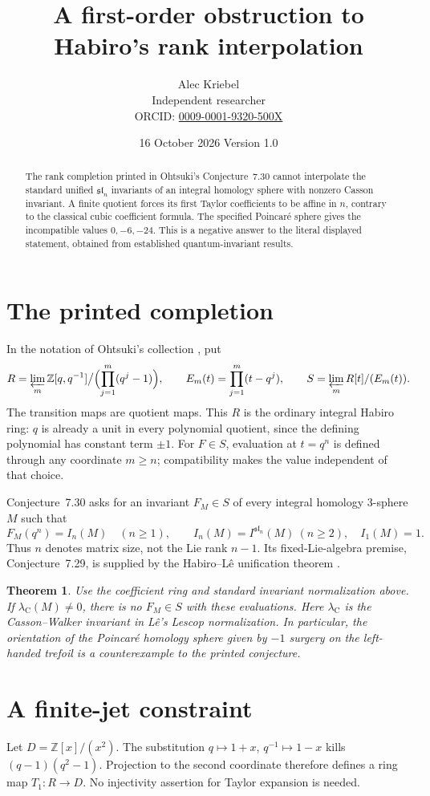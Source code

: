 \documentclass[11pt]{article}
\title{A first-order obstruction to Habiro's rank interpolation}
\author{Alec Kriebel\\[2pt]
\small Independent researcher\\
\small ORCID: \href{https://orcid.org/0009-0001-9320-500X}{0009-0001-9320-500X}}
\date{16 October 2026 \quad Version 1.0}
\newtheorem{theorem}{Theorem}
\newcommand{\Z}{\mathbb Z}
\newcommand{\slie}{\mathfrak{sl}}
\newcommand{\Cass}{\lambda_{\mathrm C}}
\begin{document}
\maketitle
\begin{abstract}
The rank completion printed in Ohtsuki's Conjecture~7.30 cannot interpolate
the standard unified $\slie_n$ invariants of an integral homology sphere
with nonzero Casson invariant. A finite quotient forces its first Taylor
coefficients to be affine in $n$, contrary to the classical cubic
coefficient formula. The specified Poincar\'e sphere gives the incompatible
values $0,-6,-24$. This is a negative answer to the literal displayed
statement, obtained from established quantum-invariant results.
\end{abstract}

\section{The printed completion}
In the notation of Ohtsuki's collection \cite[pp.~490--492]{O}, put
\[
 R=\varprojlim_m\Z[q,q^{-1}]
       \big/\Bigl(\prod_{j=1}^{m}(q^j-1)\Bigr),\qquad
 E_m(t)=\prod_{j=1}^{m}(t-q^j),\qquad
 S=\varprojlim_m R[t]/(E_m(t)).
\]
The transition maps are quotient maps. This $R$ is the ordinary integral
Habiro ring: $q$ is already a unit in every polynomial quotient, since
the defining polynomial has constant term $\pm1$.
For $F\in S$, evaluation at $t=q^n$ is defined through any coordinate
$m\ge n$; compatibility makes the value independent of that choice.

Conjecture~7.30 asks for an invariant $F_M\in S$ of every integral
homology $3$-sphere $M$ such that
\[
 F_M(q^n)=I_n(M)\quad(n\ge1),\qquad
 I_n(M)=I^{\slie_n}(M)\ (n\ge2),\quad I_1(M)=1.
\]
Thus $n$ denotes matrix size, not the Lie rank $n-1$.
Its fixed-Lie-algebra premise, Conjecture~7.29, is supplied by the
Habiro--L\^e unification theorem \cite[Theorem~1.1]{HL}.

\begin{theorem}\label{thm}
Use the coefficient ring and standard invariant normalization above.
If $\Cass(M)\ne0$, there is no $F_M\in S$ with these evaluations.
Here $\Cass$ is the Casson--Walker invariant in L\^e's Lescop
normalization. In particular, the orientation of the Poincar\'e homology
sphere given by $-1$ surgery on the left-handed trefoil is a counterexample
to the printed conjecture.
\end{theorem}

\section{A finite-jet constraint}
Let $D=\Z[x]/(x^2)$. The substitution $q\mapsto1+x$,
$q^{-1}\mapsto1-x$ kills $(q-1)(q^2-1)$.
Projection to the second coordinate therefore defines a ring map
$T_1:R\to D$. No injectivity assertion for Taylor expansion is needed.
\end{document}
